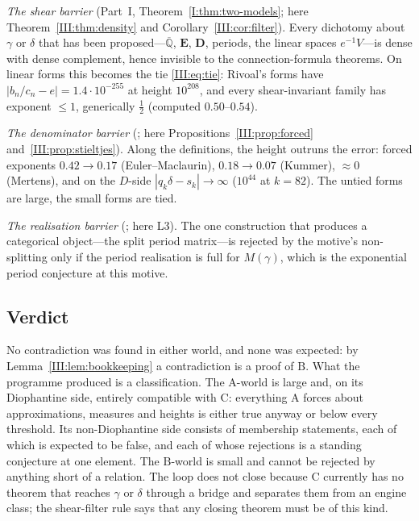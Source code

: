 \documentclass[11pt,a4paper]{article}
\newcommand{\Qbar}{\overline{\mathbb Q}}
\newcommand{\EE}{\mathbf E}
\newcommand{\DD}{\mathbf D}
\theoremstyle{definition}
\theoremstyle{remark}
\numberwithin{equation}{section}
\begin{document}
\emph{The shear barrier} (Part~I, Theorem~\ref{I:thm:two-models}; here Theorem~\ref{III:thm:density} and
Corollary~\ref{III:cor:filter}). Every dichotomy about $\gamma$ or $\delta$ that has been
proposed---$\Qbar$, $\EE$, $\DD$, periods, the linear spaces $e^{-1}V$---is dense with
dense complement, hence invisible to the connection-formula theorems. On linear forms
this becomes the tie \eqref{III:eq:tie}: Rivoal's forms have $|b_n/c_n-e|=1.4\cdot10^{-255}$
at height $10^{208}$, and every shear-invariant family has exponent $\le1$, generically
$\tfrac12$ (computed $0.50$--$0.54$).

\emph{The denominator barrier} (\cite{K001}; here Propositions~\ref{III:prop:forced}
and~\ref{III:prop:stieltjes}). Along the definitions, the height outruns the error: forced
exponents $0.42\to0.17$ (Euler--Maclaurin), $0.18\to0.07$ (Kummer), $\approx0$
(Mertens), and on the $D$-side $|q_k\delta-s_k|\to\infty$ ($10^{44}$ at $k=82$). The
untied forms are large, the small forms are tied.

\emph{The realisation barrier} (\cite{FJ,K002}; here L3). The one construction that
produces a categorical object---the split period matrix---is rejected by the motive's
non-splitting only if the period realisation is full for $M(\gamma)$, which is the
exponential period conjecture at this motive.

\subsection{Verdict}

No contradiction was found in either world, and none was expected: by
Lemma~\ref{III:lem:bookkeeping} a contradiction is a proof of $\mathrm B$. What the programme
produced is a classification. The $\mathrm A$-world is large and, on its Diophantine
side, entirely compatible with $\mathrm C$: everything $\mathrm A$ forces about
approximations, measures and heights is either true anyway or below every threshold.
Its non-Diophantine side consists of membership statements, each of which is expected
to be false, and each of whose rejections is a standing conjecture at one element. The
$\mathrm B$-world is small and cannot be rejected by anything short of a relation. The
loop does not close because $\mathrm C$ currently has no theorem that reaches $\gamma$
or $\delta$ through a bridge and separates them from an engine class; the shear-filter
rule says that any closing theorem must be of this kind.
\end{document}
